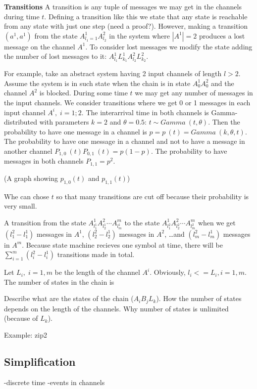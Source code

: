 \textbf{Transitions}
A transition is any tuple of messages we may get in the channels during time $t$. Defining a transition like this we state that any state is reachable from any state with just one step (need a proof?).
However, making a transition $(a^1,a^1)$ from the state $A^1_{l_1=1} A^2_{l_2}$ in the system where $|A^1|=2$ produces a lost message on the channel $A^1$. To consider lost messages we modify the state adding the number of lost messages to it: $A^1_{l_1} L^1_{k_1} A^2_{l_2} L^2_{k_2}$.

For example, take an abstract system having 2 input channels of length $l>2$. Assume the system is in such state when the chain is in state $A^1_0 A^2_0$ and the channel $A^2$ is blocked. During some time $t$ we may get any number of messages in the input channels. We consider transitions where we get 0 or 1 messages in each input channel $A^i, \; i={1;2}$. The interarrival time in both channels is Gamma-distributed with parameters $k=2$ and $\theta=0.5$: $t \sim Gamma \: (t,\theta)$. Then the probability to have one message in a channel is $p = p\:(t) = Gamma \:(k,\theta,t)$. The probability to have one message in a channel and not to have a message in another channel $P_{1,0} \: (t) P_{0,1} \: (t) = p(1-p)$. The probability to have messages in both channels $P_{1,1} = p^2$.

(A graph showing $p_{1,0}(t)$ and $p_{1,1}(t)$)

Whe can chose $t$ so that many transitions are cut off because their probability is very small.



A transition from the state $A^1_{l^1_1} A^2_{l^1_2} \cdots A^m_{l^1_m}$ to the state $A^1_{l^2_1} A^2_{l^2_2} \cdots A^m_{l^2_m}$ when we get $(l^2_1-l^1_1)$ messages in $A^1$, $(l^2_2-l^1_2)$ messages in $A^2$, \dots and $(l^2_m-l^1_m)$ messages in $A^m$. Because state machine recieves one symbol at time, there will be $\sum_{i=1}^{m}{(l^2_i-l^1_i)}$ transitions made in total.


Let $L_i, \; i=1,m$ be the length of the channel $A^i$. Obviously, $l_i <= L_i, i=1,m$. The number of states in the chain is


Describe what are the states of the chain ($A_{i} B_{j} L_{k}$). How the number of states depends on the length of the channels. Why number of states is unlimited (because of $L_{k}$).

Example: zip2
  \subsection{Simplification}
-discrete time
-events in channels

